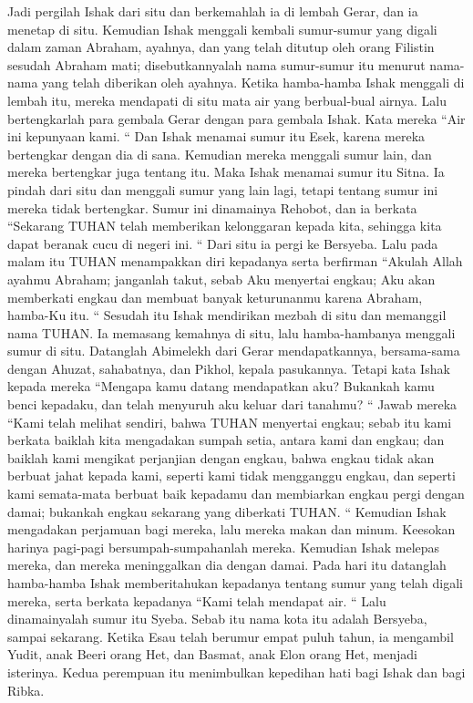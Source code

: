 \begin{biblechapter}
\verse Jadi pergilah Ishak dari situ dan berkemahlah ia di lembah Gerar, dan ia menetap di situ.
\verse Kemudian Ishak menggali kembali sumur-sumur yang digali dalam zaman Abraham, ayahnya, dan yang telah ditutup oleh orang Filistin sesudah Abraham mati; disebutkannyalah nama sumur-sumur itu menurut nama-nama yang telah diberikan oleh ayahnya.
\verse Ketika hamba-hamba Ishak menggali di lembah itu, mereka mendapati di situ mata air yang berbual-bual airnya.
\verse Lalu bertengkarlah para gembala Gerar dengan para gembala Ishak. Kata mereka “Air ini kepunyaan kami. “ Dan Ishak menamai sumur itu Esek, karena mereka bertengkar dengan dia di sana.
\verse Kemudian mereka menggali sumur lain, dan mereka bertengkar juga tentang itu. Maka Ishak menamai sumur itu Sitna.
\verse Ia pindah dari situ dan menggali sumur yang lain lagi, tetapi tentang sumur ini mereka tidak bertengkar. Sumur ini dinamainya Rehobot, dan ia berkata “Sekarang TUHAN telah memberikan kelonggaran kepada kita, sehingga kita dapat beranak cucu di negeri ini. “
\verse Dari situ ia pergi ke Bersyeba.
\verse Lalu pada malam itu TUHAN menampakkan diri kepadanya serta berfirman “Akulah Allah ayahmu Abraham; janganlah takut, sebab Aku menyertai engkau; Aku akan memberkati engkau dan membuat banyak keturunanmu karena Abraham, hamba-Ku itu. “
\verse Sesudah itu Ishak mendirikan mezbah di situ dan memanggil nama TUHAN. Ia memasang kemahnya di situ, lalu hamba-hambanya menggali sumur di situ.
\verse Datanglah Abimelekh dari Gerar mendapatkannya, bersama-sama dengan Ahuzat, sahabatnya, dan Pikhol, kepala pasukannya.
\verse Tetapi kata Ishak kepada mereka “Mengapa kamu datang mendapatkan aku? Bukankah kamu benci kepadaku, dan telah menyuruh aku keluar dari tanahmu? “
\verse Jawab mereka “Kami telah melihat sendiri, bahwa TUHAN menyertai engkau; sebab itu kami berkata baiklah kita mengadakan sumpah setia, antara kami dan engkau; dan baiklah kami mengikat perjanjian dengan engkau,
\verse bahwa engkau tidak akan berbuat jahat kepada kami, seperti kami tidak mengganggu engkau, dan seperti kami semata-mata berbuat baik kepadamu dan membiarkan engkau pergi dengan damai; bukankah engkau sekarang yang diberkati TUHAN. “
\verse Kemudian Ishak mengadakan perjamuan bagi mereka, lalu mereka makan dan minum.
\verse Keesokan harinya pagi-pagi bersumpah-sumpahanlah mereka. Kemudian Ishak melepas mereka, dan mereka meninggalkan dia dengan damai.
\verse Pada hari itu datanglah hamba-hamba Ishak memberitahukan kepadanya tentang sumur yang telah digali mereka, serta berkata kepadanya “Kami telah mendapat air. “
\verse Lalu dinamainyalah sumur itu Syeba. Sebab itu nama kota itu adalah Bersyeba, sampai sekarang.
\verse Ketika Esau telah berumur empat puluh tahun, ia mengambil Yudit, anak Beeri orang Het, dan Basmat, anak Elon orang Het, menjadi isterinya.
\verse Kedua perempuan itu menimbulkan kepedihan hati bagi Ishak dan bagi Ribka.
\end{biblechapter}

